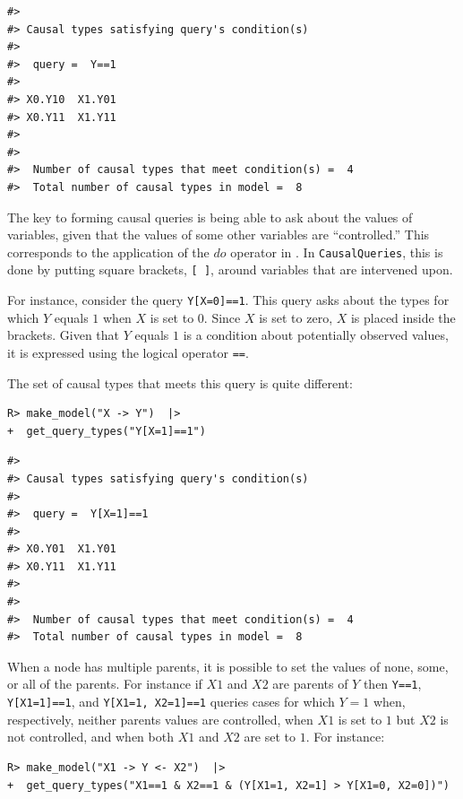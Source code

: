 \documentclass[
  11pt,
  article]{jss}
\begin{document}
\begin{verbatim}
#> 
#> Causal types satisfying query's condition(s)  
#> 
#>  query =  Y==1 
#> 
#> X0.Y10  X1.Y01
#> X0.Y11  X1.Y11
#> 
#> 
#>  Number of causal types that meet condition(s) =  4
#>  Total number of causal types in model =  8
\end{verbatim}

The key to forming causal queries is being able to ask about the values
of variables, given that the values of some other variables are
``controlled.'' This corresponds to the application of the \(do\)
operator in \citet{pearl_causality_2009}. In \texttt{CausalQueries},
this is done by putting square brackets, \texttt{{[}\ {]}}, around
variables that are intervened upon.

For instance, consider the query \texttt{Y{[}X=0{]}==1}. This query asks
about the types for which \(Y\) equals \(1\) when \(X\) is set to \(0\).
Since \(X\) is set to zero, \(X\) is placed inside the brackets. Given
that \(Y\) equals \(1\) is a condition about potentially observed
values, it is expressed using the logical operator \texttt{==}.

The set of causal types that meets this query is quite different:

\begin{verbatim}
R> make_model("X -> Y")  |> 
+  get_query_types("Y[X=1]==1")
\end{verbatim}

\begin{verbatim}
#> 
#> Causal types satisfying query's condition(s)  
#> 
#>  query =  Y[X=1]==1 
#> 
#> X0.Y01  X1.Y01
#> X0.Y11  X1.Y11
#> 
#> 
#>  Number of causal types that meet condition(s) =  4
#>  Total number of causal types in model =  8
\end{verbatim}

When a node has multiple parents, it is possible to set the values of
none, some, or all of the parents. For instance if \(X1\) and \(X2\) are
parents of \(Y\) then \texttt{Y==1}, \texttt{Y{[}X1=1{]}==1}, and
\texttt{Y{[}X1=1,\ X2=1{]}==1} queries cases for which \(Y=1\) when,
respectively, neither parents values are controlled, when \(X1\) is set
to \(1\) but \(X2\) is not controlled, and when both \(X1\) and \(X2\)
are set to \(1\). For instance:

\begin{verbatim}
R> make_model("X1 -> Y <- X2")  |>
+  get_query_types("X1==1 & X2==1 & (Y[X1=1, X2=1] > Y[X1=0, X2=0])")
\end{verbatim}
\end{document}
